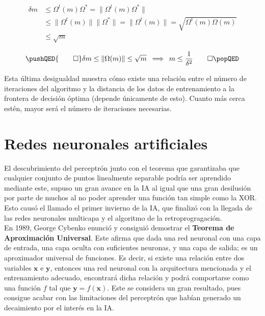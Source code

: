 		\begin{align*}
			\boxed{\delta m} &\leq \Omega^t(m)\Omega^* = \|\Omega^t(m)\Omega^*\|\\
			&\leq \|\Omega^t(m)\| \|\Omega^*\| = \|\Omega^t(m)\| = \sqrt{\Omega^t(m)\Omega(m)}\\
			& \leq \boxed{\sqrt{m}} 
		\end{align*}
		
		$$
		\pushQED{\qed} 
		\delta m \leq \|\Omega(m)\| \leq \sqrt{m} \,\,\, \Longrightarrow \,\,\, m \leq \frac{1}{\delta^2}\qedhere
		\popQED
		$$ 
		
		Esta última desigualdad muestra cómo existe una relación entre el número de iteraciones del algoritmo y la distancia de los datos de entrenamiento a la frontera de decisión óptima (depende únicamente de esto). Cuanto más cerca estén, mayor será el número de iteraciones necesarias. 
		
	\section{Redes neuronales artificiales}
	
		El descubrimiento del perceptrón junto con el teorema que garantizaba que cualquier conjunto de puntos linealmente separable podría ser aprendido mediante este, supuso un gran avance en la IA al igual que una gran desilusión por parte de muchos al no poder aprender una función tan simple como la XOR. Esto causó el llamado el primer invierno de la IA, que finalizó con la llegada de las redes neuronales multicapa y el algoritmo de la retroprogragación. \\
		
		En 1989, George Cybenko enunció y consiguió demostrar el \textbf{Teorema de Aproximación Universal}\cite{teoremaAproximacion}. Este afirma que dada una red neuronal con una capa de entrada, una capa oculta con suficientes neuronas, y una capa de salida; es un aproximador universal de funciones. Es decir, si existe una relación entre dos variables $\textbf{x}$ e $\textbf{y}$, entonces una red neuronal con la arquitectura mencionada y el entrenamiento adecuado, encontrará dicha relación y podrá comportarse como una función $f$ tal que $\textbf{y} = f(\textbf{x})$. Este se considera un gran resultado, pues consigue acabar con las limitaciones del perceptrón que habían generado un decaimiento por el interés en la IA. 
		
